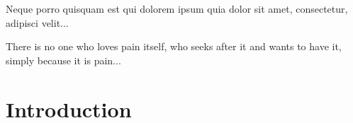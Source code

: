 \begin{savequote}[8cm]
\textlatin{Neque porro quisquam est qui dolorem ipsum quia dolor sit amet, consectetur, adipisci velit...}

There is no one who loves pain itself, who seeks after it and wants to have it, simply because it is pain...
\end{savequote}

\chapter{\label{ch:1-intro}Introduction} 

\minitoc






